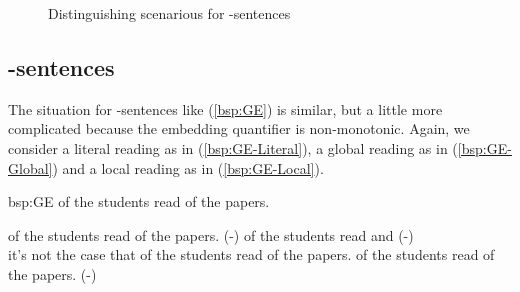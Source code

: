 \documentclass[fleqn,reqno,10pt,draft]{article}
\newcommand{\lit}{\acro{lit}}
\newcommand{\glb}{\acro{glb}}
\newcommand{\loc}{\acro{loc}}
\newcommand{\as}{\acro{as}}
\renewcommand{\es}{\acro{es}}
\begin{document}
\begin{figure}[]
{



}

  \caption{Distinguishing scenarious for \as-sentences}
  \label{fig:AS-distinguishing-pics}
\end{figure}


\subsection{\es-sentences}
\label{sec:es-sentences}

The situation for \es-sentences like (\ref{bsp:GE}) is similar, but a
little more complicated because the embedding quantifier is
non-monotonic. Again, we consider a literal reading as in
(\ref{bsp:GE-Literal}), a global reading as in (\ref{bsp:GE-Global})
and a local reading as in (\ref{bsp:GE-Local}).

\begin{exer}{bsp:GE}
\ex {} of the students read {} of the
  papers.

  \begin{xlist}
  \ex {} of the students read
    {} of the papers. \hfill (\es-\lit)
  \ex 
     of the students read  
    and  \hfill (\es-\glb)\\
    it's not the case that  of the students read  of the papers.
  \ex 
     of the students read {} of the
    papers. \hfill (\es-\loc)
  \end{xlist}
\end{exer}
\end{document}
